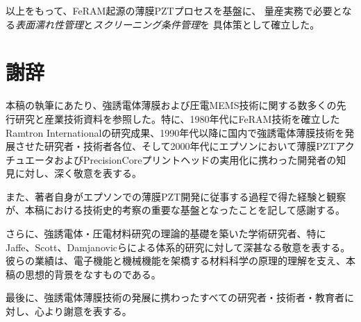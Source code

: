 \documentclass[conference]{IEEEtran}
\begin{document}
以上をもって、FeRAM起源の薄膜PZTプロセスを基盤に、
量産実務で必要となる\emph{表面濡れ性管理}と\emph{スクリーニング条件管理}を
具体策として確立した。

\section*{謝辞}
本稿の執筆にあたり、強誘電体薄膜および圧電MEMS技術に関する数多くの先行研究と産業技術資料を参照した。特に、1980年代にFeRAM技術を確立したRamtron Internationalの研究成果、1990年代以降に国内で強誘電体薄膜技術を発展させた研究者・技術者各位、そして2000年代にエプソンにおいて薄膜PZTアクチュエータおよびPrecisionCoreプリントヘッドの実用化に携わった開発者の知見に対し、深く敬意を表する。

また、著者自身がエプソンでの薄膜PZT開発に従事する過程で得た経験と観察が、本稿における技術史的考察の重要な基盤となったことを記して感謝する。

さらに、強誘電体・圧電材料研究の理論的基礎を築いた学術研究者、特にJaffe、Scott、Damjanovicらによる体系的研究に対して深甚なる敬意を表する。彼らの業績は、電子機能と機械機能を架橋する材料科学の原理的理解を支え、本稿の思想的背景をなすものである。

最後に、強誘電体薄膜技術の発展に携わったすべての研究者・技術者・教育者に対し、心より謝意を表する。
\end{document}
